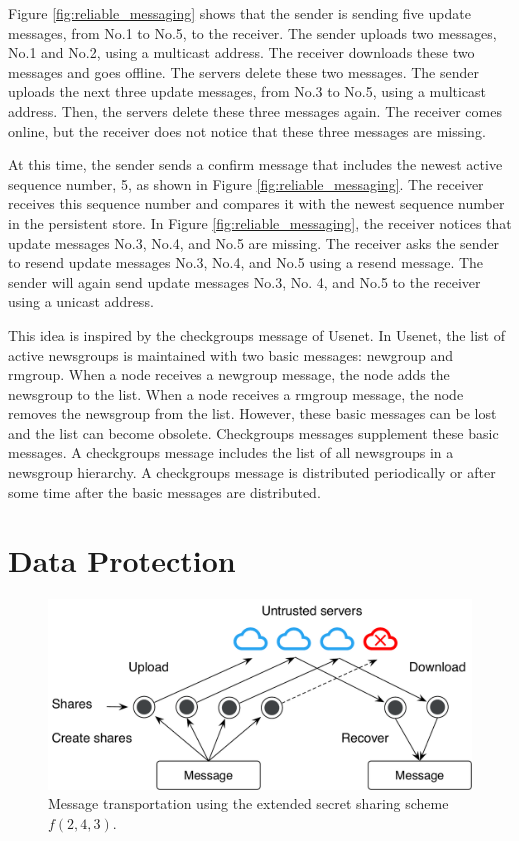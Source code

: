 \documentclass[a4paper,11pt]{report}
\begin{document}
Figure \ref{fig:reliable_messaging} shows that the sender is sending five update messages, from No.1 to No.5, to the receiver.
The sender uploads two messages, No.1 and No.2, using a multicast address.
The receiver downloads these two messages and goes offline.
The servers delete these two messages.
The sender uploads the next three update messages, from No.3 to No.5, using a multicast address.
Then, the servers delete these three messages again.
The receiver comes online, but the receiver does not notice that these three messages are missing.

At this time, the sender sends a confirm message that includes the newest active sequence number, 5, as shown in Figure \ref{fig:reliable_messaging}.
The receiver receives this sequence number and compares it with the newest sequence number in the persistent store.
In Figure \ref{fig:reliable_messaging}, the receiver notices that update messages No.3, No.4, and No.5 are missing.
The receiver asks the sender to resend update messages No.3, No.4, and No.5 using a resend message.
The sender will again send update messages No.3, No. 4, and No.5 to the receiver using a unicast address.

This idea is inspired by the checkgroups message of Usenet\cite{usenet}.
In Usenet, the list of active newsgroups is maintained with two basic messages: newgroup and rmgroup.
When a node receives a newgroup message, the node adds the newsgroup to the list.
When a node receives a rmgroup message, the node removes the newsgroup from the list.
However, these basic messages can be lost and the list can become obsolete.
Checkgroups messages supplement these basic messages.
A checkgroups message includes the list of all newsgroups in a newsgroup hierarchy.
A checkgroups message is distributed periodically or after some time after the basic messages are distributed.

\section{Data Protection}  \label{section:data_protection}

\begin{figure}[t]
	\centering
	\includegraphics[scale=0.65]{transportation}
	\caption{Message transportation using the extended secret sharing scheme $f(2, 4, 3)$.}
	\label{fig:transportation}
\end{figure}
\end{document}
